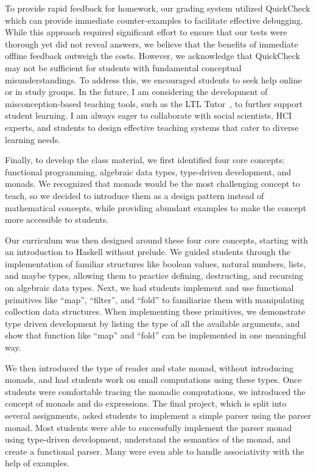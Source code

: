 \documentclass[11pt,a4paper,sans]{moderncv} %
\begin{document}
To provide rapid feedback for homework, our grading system utilized QuickCheck which can provide immediate counter-examples to facilitate effective debugging. 
While this approach required significant effort to ensure that our tests were thorough yet did not reveal answers, we believe that the benefits of immediate offline feedback outweigh the costs. 
However, we acknowledge that QuickCheck may not be sufficient for students with fundamental conceptual misunderstandings. 
To address this, we encouraged students to seek help online or in study groups. 
In the future, I am considering the development of misconception-based teaching tools, such as the LTL Tutor~\cite{plt_LTLTutor_2024}, to further support student learning. 
I am always eager to collaborate with social scientists, HCI experts, and students to design effective teaching systems that cater to diverse learning needs.

Finally, to develop the class material, we first identified four core concepts: functional programming, algebraic data types, type-driven development, and monads. 
We recognized that monads would be the most challenging concept to teach, so we decided to introduce them as a design pattern instead of mathematical concepts, while providing abundant examples to make the concept more accessible to students.

Our curriculum was then designed around these four core concepts, starting with an introduction to Haskell without prelude. 
We guided students through the implementation of familiar structures like boolean values, natural numbers, lists, and maybe types, allowing them to practice defining, destructing, and recursing on algebraic data types. 
Next, we had students implement and use functional primitives like ``map'', ``filter'', and ``fold'' to familiarize them with manipulating collection data structures.
When implementing these primitives, we demonstrate type driven development by listing the type of all the available arguments, and show that function like ``map'' and ``fold'' can be implemented in one meaningful way.

We then introduced the type of reader and state monad, without introducing monads, and had students work on small computations using these types. 
Once students were comfortable tracing the monadic computations, we introduced the concept of monads and do expressions. 
The final project, which is split into several assignments, asked students to implement a simple parser using the parser monad. 
Most students were able to successfully implement the parser monad using type-driven development, understand the semantics of the monad, and create a functional parser. 
Many were even able to handle associativity with the help of examples.
\end{document}
